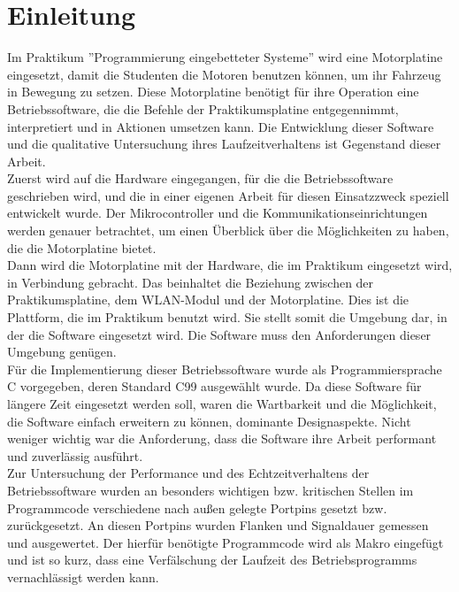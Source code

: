 \chapter{Einleitung}

Im Praktikum ''Programmierung eingebetteter Systeme'' wird eine Motorplatine \cite{STUD_TIMO}
eingesetzt, damit die Studenten die Motoren benutzen können, um ihr Fahrzeug
in Bewegung zu setzen. Diese Motorplatine benötigt für ihre Operation eine
Betriebssoftware, die die Befehle der Praktikumsplatine entgegennimmt,
interpretiert und in Aktionen umsetzen kann. Die Entwicklung dieser Software
und die qualitative Untersuchung ihres Laufzeitverhaltens ist Gegenstand
dieser Arbeit.\\
Zuerst wird auf die Hardware eingegangen, für die die Betriebssoftware geschrieben wird,
und die in einer eigenen Arbeit für diesen Einsatzzweck speziell entwickelt wurde.
Der Mikrocontroller und die Kommunikationseinrichtungen werden genauer betrachtet, um
einen Überblick über die Möglichkeiten zu haben, die die Motorplatine bietet.\\
Dann wird die Motorplatine mit der Hardware, die im Praktikum eingesetzt wird, in Verbindung
gebracht. Das beinhaltet die Beziehung zwischen der Praktikumsplatine, dem WLAN-Modul und der
Motorplatine. Dies ist die Plattform, die im Praktikum benutzt wird. Sie stellt somit die
Umgebung dar, in der die Software eingesetzt wird. Die Software muss den Anforderungen
dieser Umgebung genügen.\\
Für die Implementierung dieser Betriebssoftware wurde als Programmiersprache
C \cite{C_PROG} vorgegeben, deren Standard C99 ausgewählt wurde. Da diese
Software für längere Zeit eingesetzt werden soll, waren die
Wartbarkeit und die Möglichkeit, die Software einfach erweitern zu können,
dominante Designaspekte. Nicht weniger wichtig war die Anforderung, dass die Software
ihre Arbeit performant und zuverlässig ausführt.\\
Zur Untersuchung der Performance und des Echtzeitverhaltens der Betriebssoftware wurden
an besonders wichtigen bzw. kritischen Stellen im Programmcode
verschiedene nach außen gelegte Portpins gesetzt bzw. zurückgesetzt. An diesen Portpins
wurden Flanken und Signaldauer gemessen und ausgewertet. Der hierfür benötigte
Programmcode wird als Makro eingefügt und ist so kurz, dass eine Verfälschung der Laufzeit des
Betriebsprogramms vernachlässigt werden kann.
